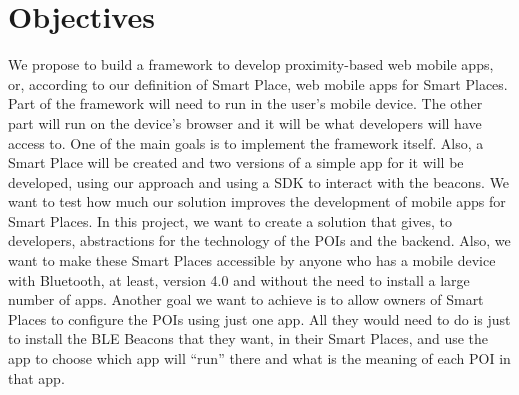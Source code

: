 
% 
% 

\section{Objectives}
\label{sec:objectives}

We propose
to build a framework to develop proximity-based web mobile
apps, or, according to our definition of Smart Place, web
mobile apps for Smart Places.
Part of the framework will need to run in the user's 
mobile device.
The other part will run on the device's browser and
it will be what developers will have access to.
One of the main goals is to implement the framework itself.
Also, a Smart Place will be created and 
two versions of a simple
app for it will be developed, using our approach and using a SDK to interact with the beacons.
We want to test how much our solution improves the
development of mobile apps for Smart Places.
In this project, we want to create a solution that
gives, to developers, abstractions for the technology
of the POIs and the backend.
Also, we want to make these Smart Places accessible by 
anyone who has a mobile device with Bluetooth, at least,
version 4.0 and without the need to install a large number
of apps.
Another goal we want to achieve is to allow owners of
Smart Places to configure the POIs using just one app.
All they would need to do is just to install the BLE Beacons
that they want, in their Smart Places, and use the app
to choose which app will ``run'' there and what is the meaning
of each POI in that app.




